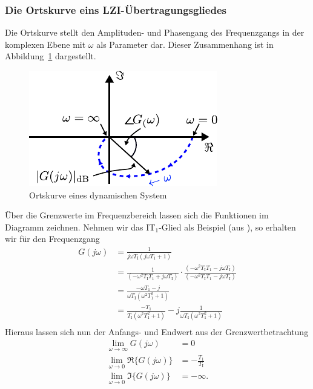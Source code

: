 \subsubsection{Die Ortskurve eins LZI-Übertragungsgliedes}
%
Die Ortskurve stellt den Amplituden- und Phasengang des Frequenzgangs in der komplexen Ebene mit $\omega$ als Parameter dar. Dieser Zusammenhang ist in Abbildung~\ref{fig:Ortskurve} dargestellt.
%
\begin{figure}[h!]
	\centering
	\includegraphics[width=0.45\linewidth]{Abbildungen/Modellbildung/PDF/Ortskurve.pdf}
	\caption{Ortskurve eines dynamischen System}
	\label{fig:Ortskurve}
\end{figure}
%
Über die Grenzwerte im Frequenzbereich lassen sich die Funktionen im Diagramm zeichnen. Nehmen wir das IT$_{1}$-Glied als Beispiel (aus \cite{Lunze10}), so erhalten wir für den Frequenzgang
%
\begin{equation*}
\begin{aligned}
%
G(j\omega)&=\frac{1}{j\omega T_{\text{I}}\left(j \omega T_{1}+1\right)}\\
%
&=\frac{1}{\left(-\omega^{2}T_{\text{I}}T_{1}+j\omega T_{\text{I}}\right)}\cdot\frac{\left(-\omega^{2}T_{\text{I}}T_{1}-j\omega T_{\text{I}}\right)}{\left(-\omega^{2}T_{\text{I}}T_{1}-j\omega T_{\text{I}}\right)}\\
%
&=\frac{-\omega T_{1}-j}{\omega T_{\text{I}}\left(\omega^{2}T^{2}_{1}+1\right)}\\
%
&=\frac{-T_{1}}{T_{\text{I}}\left(\omega^{2}T^{2}_{1}+1\right)}-j\frac{1}{\omega T_{\text{I}}\left(\omega^{2}T^{2}_{1}+1\right)}\\
%
\end{aligned}
\end{equation*} 
%
Hieraus lassen sich nun der Anfangs- und Endwert aus der Grenzwertbetrachtung
%
\begin{equation*}
\begin{aligned}
%
\lim\limits_{\omega\rightarrow \infty}G(j\omega)&=0\\
%
\lim\limits_{\omega\rightarrow 0}\Re\{G(j\omega)\}&=-\frac{T_{1}}{T_{\text{I}}}\\
%
\lim\limits_{\omega\rightarrow 0}\Im\{G(j\omega)\}&=-\infty.
%
\end{aligned}
\end{equation*} 
